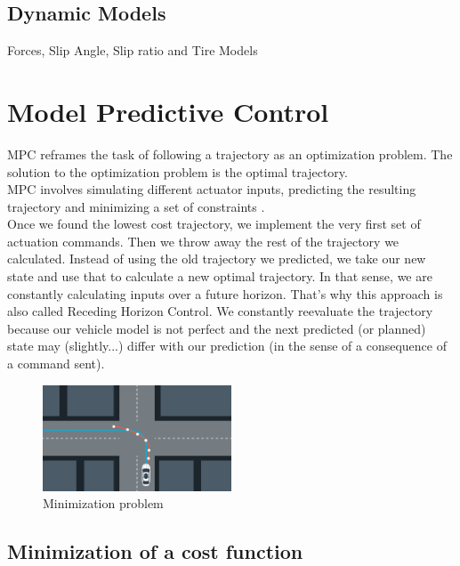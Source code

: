 \documentclass[11pt]{article}
\begin{document}
\subsection{Dynamic Models}


Forces, Slip Angle, Slip ratio and Tire Models


\section{Model Predictive Control}

MPC reframes the task of following a trajectory as an optimization problem. The solution to the optimization problem is the optimal trajectory. \\

MPC involves simulating different actuator inputs, predicting the resulting trajectory and minimizing a set of constraints . \\ 


Once we found the lowest cost trajectory, we implement the very first set of actuation commands. Then we throw away the rest of the trajectory we calculated. Instead of using the old trajectory we predicted, we take our new state and use that to calculate a new optimal trajectory. In that sense, we are constantly calculating inputs over a future horizon. That's why this approach is also called Receding Horizon Control. We constantly reevaluate the trajectory because our vehicle model is not perfect and the next predicted (or planned) state may (slightly...) differ with our prediction (in the sense of a consequence of a command sent). 


\begin{figure}[h]
    \centering
    \includegraphics[width=0.5\textwidth]{minimization}
    \caption{Minimization problem}
    \label{fig:minimization}
\end{figure} 

\subsection{Minimization of a cost function}
\end{document}
